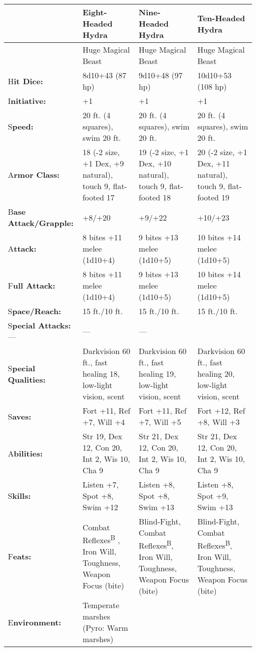 \documentclass{article}
\begin{document}
\vspace{12pt}
\begin{tabular}{|>{\raggedright}p{51pt}|>{\raggedright}p{83pt}|>{\raggedright}p{83pt}|>{\raggedright}p{83pt}|}
\hline
  & E\textbf{ight-Headed Hydra } & N\textbf{ine-Headed Hydra} & T\textbf{en-Headed 
Hydra}\tabularnewline
\hline
  & Huge Magical Beast & Huge Magical Beast & Huge Magical Beast\tabularnewline
\hline
H\textbf{it Dice:} & 8d10+43 (87 hp) & 9d10+48 (97 hp) & 10d10+53 (108 hp)\tabularnewline
\hline
I\textbf{nitiative:} & +1 & +1 & +1\tabularnewline
\hline
S\textbf{peed:} & 20 ft. (4 squares), swim 20 ft. & 20 ft. (4 squares), swim 20 
ft. & 20 ft. (4 squares), swim 20 ft.\tabularnewline
\hline
A\textbf{rmor Class:} & 18 (-2 size, +1 Dex, +9 natural), touch 9, flat-footed 
17 & 19 (-2 size, +1 Dex, +10 natural), touch 9, flat-footed 18 & 20 (-2 size, 
+1 Dex, +11 natural), touch 9, flat-footed 19\tabularnewline
\hline
B\textbf{ase Attack/Grapple:} & +8/+20 & +9/+22 & +10/+23\tabularnewline
\hline
A\textbf{ttack:} & 8 bites +11 melee (1d10+4) & 9 bites +13 melee (1d10+5) & 10 
bites +14 melee (1d10+5)\tabularnewline
\hline
F\textbf{ull Attack:} & 8 bites +11 melee (1d10+4) & 9 bites +13 melee (1d10+5) & 10 
bites +14 melee (1d10+5)\tabularnewline
\hline
S\textbf{pace/Reach:} & 15 ft./10 ft. & 15 ft./10 ft. & 15 ft./10 ft.\tabularnewline
\hline
S\textbf{pecial Attacks:}--- & --- & --- & \tabularnewline
\hline
S\textbf{pecial Qualities:} & Darkvision 60 ft., fast healing 18, low-light vision, 
scent & Darkvision 60 ft., fast healing 19, low-light vision, scent & Darkvision 
60 ft., fast healing 20, low-light vision, scent\tabularnewline
\hline
S\textbf{aves:} & Fort +11, Ref +7, Will +4 & Fort +11, Ref +7, Will +5 & Fort 
+12, Ref +8, Will +3\tabularnewline
\hline
A\textbf{bilities:} & Str 19, Dex 12, Con 20, Int 2, Wis 10, Cha 9 & Str 21, Dex 
12, Con 20, Int 2, Wis 10, Cha 9 & Str 21, Dex 12, Con 20, Int 2, Wis 10, Cha 9\tabularnewline
\hline
S\textbf{kills:} & Listen +7, Spot +8, Swim +12 & Listen +8, Spot +8, Swim +13 & Listen 
+8, Spot +9, Swim +13\tabularnewline
\hline
F\textbf{eats:} & Combat Reflexes\textsuperscript{B}{\scriptsize{} }, Iron Will, 
Toughness, Weapon Focus (bite) & Blind-Fight, Combat Reflexes\textsuperscript{B}, 
Iron Will, Toughness, Weapon Focus (bite) & Blind-Fight, Combat Reflexes\textsuperscript{B}, 
Iron Will, Toughness, Weapon Focus (bite)\tabularnewline
\hline
E\textbf{nvironment:} & Temperate marshes \linebreak{}
(Pyro: Warm marshes) \linebreak{}

\end{tabular}
\end{document}
